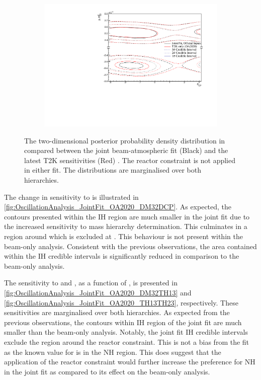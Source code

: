 \begin{figure}[h]
  \begin{subfigure}[t]{0.98\textwidth}
    \includegraphics[width=\textwidth, trim={0mm 0mm 0mm 0mm}, clip,page=1]{Figures/OA/JointFit_OA2020_Comp/ContourComparison_2D_dcp_dm32_BH_1_woRC_UnSmeared_CredibleInterval.pdf}
  \end{subfigure}
  \caption{The two-dimensional posterior probability density distribution in  compared between the joint beam-atmospheric fit (Black) and the latest T2K sensitivities (Red) \cite{t2k_tn_399}. The reactor constraint is not applied in either fit. The distributions are marginalised over both hierarchies.}
  \label{fig:OscillationAnalysis_JointFit_OA2020_DM32DCP}
\end{figure}

The change in sensitivity to  is illustrated in \autoref{fig:OscillationAnalysis_JointFit_OA2020_DM32DCP}. As expected, the contours presented within the IH region are much smaller in the joint fit due to the increased sensitivity to mass hierarchy determination. This culminates in a region around  which is excluded at \quickmath{3\sigma}. This behaviour is not present within the beam-only analysis. Consistent with the previous observations, the area contained within the IH credible intervals is significantly reduced in comparison to the beam-only analysis.

The sensitivity to  and , as a function of , is presented in \autoref{fig:OscillationAnalysis_JointFit_OA2020_DM32TH13} and \autoref{fig:OscillationAnalysis_JointFit_OA2020_TH13TH23}, respectively. These sensitivities are marginalised over both hierarchies. As expected from the previous observations, the  contours within IH region of the joint fit are much smaller than the beam-only analysis. Notably, the joint fit IH \quickmath{1\sigma} credible intervals exclude the region around the reactor constraint. This is not a bias from the fit as the known value for  is in the NH region. This does suggest that the application of the reactor constraint would further increase the preference for NH in the joint fit as compared to its effect on the beam-only analysis.

